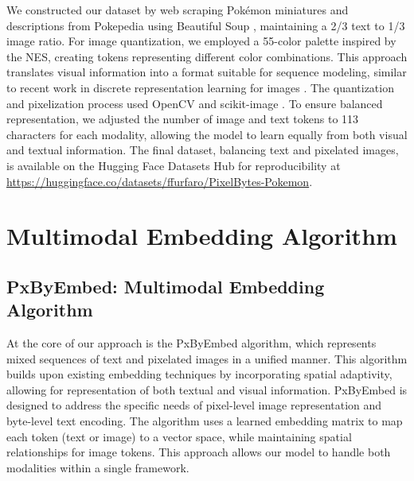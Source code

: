 \documentclass[10pt,a4paper]{article}
\begin{document}
We constructed our dataset by web scraping Pokémon miniatures and descriptions from Pokepedia using Beautiful Soup \cite{richardson2007beautiful}, maintaining a 2/3 text to 1/3 image ratio. For image quantization, we employed a 55-color palette inspired by the NES, creating tokens representing different color combinations. This approach translates visual information into a format suitable for sequence modeling, similar to recent work in discrete representation learning for images \cite{van2017neural}. The quantization and pixelization process used OpenCV and scikit-image \cite{bradski2000opencv, vanderwalt2014scikit}. To ensure balanced representation, we adjusted the number of image and text tokens to 113 characters for each modality, allowing the model to learn equally from both visual and textual information. The final dataset, balancing text and pixelated images, is available on the Hugging Face Datasets Hub for reproducibility at \url{https://huggingface.co/datasets/ffurfaro/PixelBytes-Pokemon}.

\section{Multimodal Embedding Algorithm}

\subsection{PxByEmbed: Multimodal Embedding Algorithm}

At the core of our approach is the PxByEmbed algorithm, which represents mixed sequences of text and pixelated images in a unified manner. This algorithm builds upon existing embedding techniques by incorporating spatial adaptivity, allowing for representation of both textual and visual information. PxByEmbed is designed to address the specific needs of pixel-level image representation and byte-level text encoding. The algorithm uses a learned embedding matrix to map each token (text or image) to a vector space, while maintaining spatial relationships for image tokens. This approach allows our model to handle both modalities within a single framework.
\end{document}
